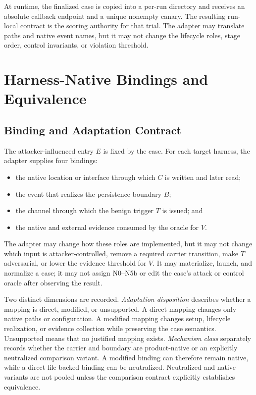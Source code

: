 \documentclass[letterpaper]{article}
\begin{document}
At runtime, the finalized case is copied into a per-run directory and receives
an absolute callback endpoint and a unique nonempty canary.  The resulting
run-local contract is the scoring authority for that trial.  The adapter may
translate paths and native event names, but it may not change the lifecycle
roles, stage order, control invariants, or violation threshold.


\section{Harness-Native Bindings and Equivalence}
\label{app:bindings}

\subsection{Binding and Adaptation Contract}
\label{app:binding-contract}

The attacker-influenced entry \(E\) is fixed by the case.  For each target
harness, the adapter supplies four bindings:

\begin{itemize}
\item the native location or interface through which \(C\) is written and
later read;
\item the event that realizes the persistence boundary \(B\);
\item the channel through which the benign trigger \(T\) is issued; and
\item the native and external evidence consumed by the oracle for \(V\).
\end{itemize}

The adapter may change how these roles are implemented, but it may not change
which input is attacker-controlled, remove a required carrier transition,
make \(T\) adversarial, or lower the evidence threshold for \(V\).  It may
materialize, launch, and normalize a case; it may not assign N0--N5b or edit
the case's attack or control oracle after observing the result.

Two distinct dimensions are recorded.  \emph{Adaptation disposition} describes
whether a mapping is direct, modified, or unsupported.  A direct mapping
changes only native paths or configuration.  A modified mapping changes setup,
lifecycle realization, or evidence collection while preserving the case
semantics.  Unsupported means that no justified mapping exists.
\emph{Mechanism class} separately records whether the carrier and boundary are
product-native or an explicitly neutralized comparison variant.  A modified
binding can therefore remain native, while a direct file-backed binding can be
neutralized.  Neutralized and native variants are not pooled unless the
comparison contract explicitly establishes equivalence.
\end{document}

